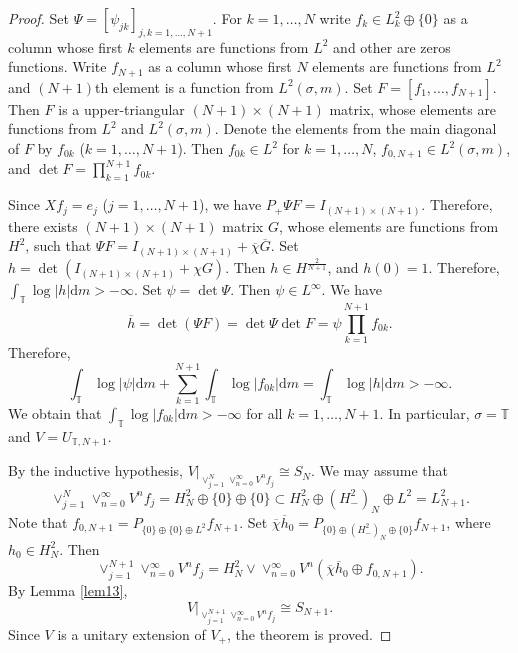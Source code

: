 \documentclass[10pt,a4paper]{amsart}
\begin{document}
\begin{proof}
Set $\Psi=[\psi_{jk}]_{j,k=1,\ldots, N+1}$. 
For $k=1,\ldots, N$ write $f_k\in L^2_k\oplus\{0\}$ as a column whose first $k$ elements are functions from $L^2$ and other are zeros functions. 
 Write $f_{N+1}$ as a column whose first $N$ elements are functions from $L^2$ and $(N+1)$th element is a 
function from $L^2(\sigma,m)$. Set $F=[f_1,\ldots,f_{N+1}]$.
 Then $F$ is a upper-triangular $(N+1)\times (N+1)$ matrix, 
whose elements are functions from $L^2$ and $L^2(\sigma,m)$. Denote the elements from the main diagonal of $F$ by $f_{0k}$ ($k=1,\ldots, N+1$).
Then $f_{0k}\in L^2$ for $k=1,\ldots, N$,  $f_{0,N+1}\in L^2(\sigma,m)$, and $\det F=\prod_{k=1}^{N+1}f_{0k}$.

Since $Xf_j=e_j$ ($j=1,\ldots, N+1$), we have $P_+\Psi F=I_{(N+1)\times (N+1)}$. Therefore,
 there exists $(N+1)\times (N+1)$ matrix $G$, whose elements are functions from $H^2$, such that 
$\Psi F=I_{(N+1)\times (N+1)}+\overline\chi\overline G$.
Set $h=\det(I_{(N+1)\times (N+1)}+\chi G)$. Then $h\in H^{\frac{2}{N+1}}$, and $h(0)=1$. Therefore,  
$\int_{\mathbb T}\log|h|\mathrm{d}m>-\infty$. 
Set $\psi=\det \Psi$. Then $\psi\in L^\infty$. We have 
\begin{equation*}\overline h=\det(\Psi F)=\det\Psi\det F=\psi\prod_{k=1}^{N+1}f_{0k}.
\end{equation*}
Therefore, 
\begin{equation*}
\int_{\mathbb T}\log|\psi|\mathrm{d}m+\sum_{k=1}^{N+1}\int_{\mathbb T}\log|f_{0k}|\mathrm{d}m=
\int_{\mathbb T}\log|h|\mathrm{d}m>-\infty.
\end{equation*}
We obtain that $\int_{\mathbb T}\log|f_{0k}|\mathrm{d}m>-\infty$ for all $k=1,\ldots, N+1$. In particular, $\sigma=\mathbb T$ 
and $V=U_{\mathbb T,N+1}$. 

By the inductive hypothesis, $V|_{\vee_{j=1}^N \vee_{n=0}^\infty V^n f_j}\cong S_N$. We may assume that 
\begin{equation*}\vee_{j=1}^N \vee_{n=0}^\infty V^n f_j=H^2_N\oplus\{0\}\oplus\{0\}\subset 
H^2_N\oplus (H^2_-)_N\oplus L^2=L^2_{N+1}. \end{equation*}  
Note that  $f_{0,N+1}=P_{\{0\}\oplus\{0\}\oplus L^2}f_{N+1}$. 
Set $\overline\chi\overline h_0=P_{\{0\}\oplus (H^2_-)_N\oplus\{0\}}f_{N+1}$, where $h_0\in H^2_N$.  
Then \begin{equation*}\vee_{j=1}^{N+1} \vee_{n=0}^\infty V^n f_j 
=H^2_N\vee\vee_{n=0}^\infty V^n(\overline\chi\overline h_0\oplus f_{0,N+1}).
\end{equation*}
By Lemma \ref{lem13}, \begin{equation*}V|_{\vee_{j=1}^{N+1} \vee_{n=0}^\infty V^n f_j}\cong S_{N+1}.\end{equation*}
Since $V$ is a unitary extension of $V_+$, the theorem is proved. 
\end{proof}
\end{document}
